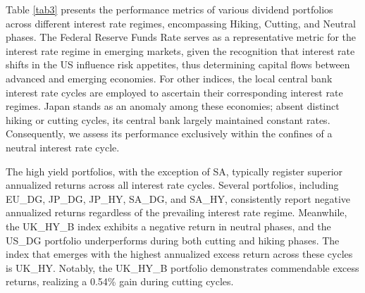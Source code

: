 \documentclass[11pt,preprint, authoryear]{elsarticle}
\numberwithin{equation}{section}
\numberwithin{figure}{section}
\numberwithin{table}{section}
\begin{document}
Table \ref{tab3} presents the performance metrics of various dividend
portfolios across different interest rate regimes, encompassing Hiking,
Cutting, and Neutral phases. The Federal Reserve Funds Rate serves as a
representative metric for the interest rate regime in emerging markets,
given the recognition that interest rate shifts in the US influence risk
appetites, thus determining capital flows between advanced and emerging
economies. For other indices, the local central bank interest rate
cycles are employed to ascertain their corresponding interest rate
regimes. Japan stands as an anomaly among these economies; absent
distinct hiking or cutting cycles, its central bank largely maintained
constant rates. Consequently, we assess its performance exclusively
within the confines of a neutral interest rate cycle.

The high yield portfolios, with the exception of SA, typically register
superior annualized returns across all interest rate cycles. Several
portfolios, including EU\_DG, JP\_DG, JP\_HY, SA\_DG, and SA\_HY,
consistently report negative annualized returns regardless of the
prevailing interest rate regime. Meanwhile, the UK\_HY\_B index exhibits
a negative return in neutral phases, and the US\_DG portfolio
underperforms during both cutting and hiking phases. The index that
emerges with the highest annualized excess return across these cycles is
UK\_HY. Notably, the UK\_HY\_B portfolio demonstrates commendable excess
returns, realizing a 0.54\% gain during cutting cycles.
\end{document}
